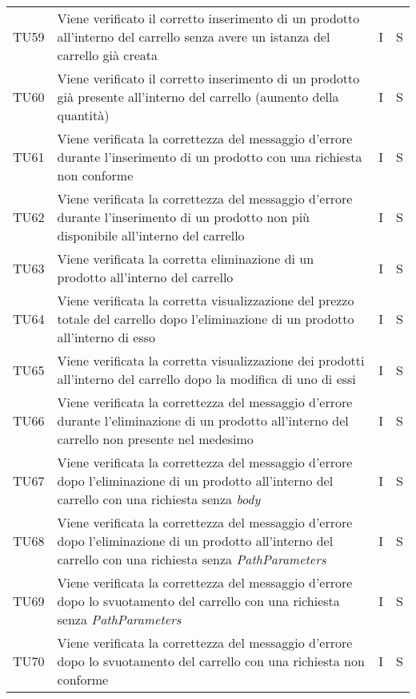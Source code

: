 {\begin{longtable}{C{2cm} C{9.6cm} C{1.5cm} C{1cm}}
TU59 & Viene verificato il corretto inserimento di un prodotto all'interno del carrello senza avere un istanza del carrello già creata & I & S\\

TU60 & Viene verificato il corretto inserimento di un prodotto già presente all'interno del carrello (aumento della quantità)& I & S\\

TU61 & Viene verificata la correttezza del messaggio d'errore durante l'inserimento di un prodotto con una richiesta non conforme & I & S\\

TU62 & Viene verificata la correttezza del messaggio d'errore durante l'inserimento di un prodotto non più disponibile all'interno del carrello & I & S\\

TU63 & Viene verificata la corretta eliminazione di un prodotto all'interno del carrello & I & S\\

TU64 & Viene verificata la corretta visualizzazione del prezzo totale del carrello dopo l'eliminazione di un prodotto all'interno di esso & I & S\\

TU65 & Viene verificata la corretta visualizzazione dei prodotti all'interno del carrello dopo la modifica di uno di essi & I & S\\

TU66 & Viene verificata la correttezza del messaggio d'errore durante l'eliminazione di un prodotto all'interno del carrello non presente nel medesimo & I & S\\

TU67 & Viene verificata la correttezza del messaggio d'errore dopo l'eliminazione di un prodotto all'interno del carrello con una richiesta senza \textit{body} & I & S\\

TU68 & Viene verificata la correttezza del messaggio d'errore dopo l'eliminazione di un prodotto all'interno del carrello con una richiesta senza \textit{PathParameters} & I & S\\

TU69 & Viene verificata la correttezza del messaggio d'errore dopo lo svuotamento del carrello con una richiesta senza \textit{PathParameters} & I & S\\

TU70 & Viene verificata la correttezza del messaggio d'errore dopo lo svuotamento del carrello con una richiesta non conforme & I & S\\


\end{longtable}}
